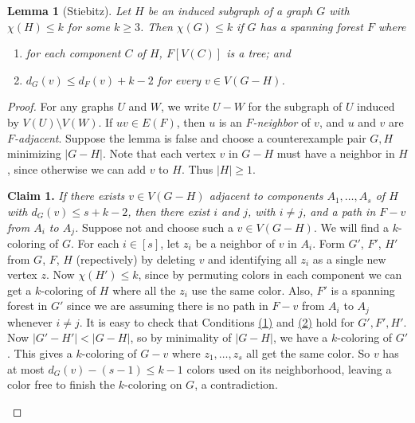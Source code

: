 \documentclass[12pt]{article}
\theoremstyle{plain}
\newtheorem*{Lemma}{Lemma}
\theoremstyle{definition}
\theoremstyle{remark}
\newcommand{\card}[1]{\left|#1\right|}
\newcommand{\irange}[1]{\left[#1\right]}
\newcommand{\brackets}[1]{\left[ #1 \right]}
\begin{document}
\begin{Lemma}[Stiebitz]
\label{stiebitz}
Let $H$ be an induced subgraph of a graph $G$ with $\chi(H) \le k$ for some $k \ge 3$.  Then $\chi(G) \le k$ if $G$ has a spanning forest $F$ where
\begin{enumerate}
\item for each component $C$ of $H$, $F\brackets{V(C)}$ is a tree; and
\label{cond1}
\item $d_G(v) \le d_F(v) + k-2$ for every $v \in V(G-H)$.
\label{cond2}
\end{enumerate}
\end{Lemma}
\begin{proof}
For any graphs $U$ and $W$, we write $U-W$ for the subgraph of $U$ induced by
$V(U)\setminus V(W)$.
If $uv\in E(F)$, then $u$ is an \emph{$F$-neighbor} of $v$, and $u$ and $v$ are
\emph{$F$-adjacent}.
Suppose the lemma is false and choose a counterexample pair $G, H$ minimizing
$|G-H|$.
Note that each vertex $v$ in $G-H$ must have a neighbor in $H$, since 
otherwise we can add $v$ to $H$.  Thus $\card{H}\ge 1$.

\textbf{Claim 1.} \textit{If there exists $v \in V(G-H)$ adjacent to
components $A_1, \ldots, A_s$ of $H$ with $d_G(v) \le s + k - 2$, then there
exist $i$ and $j$, with $i \ne j$, and a path in $F-v$ from $A_i$ to $A_j$.}
Suppose not and choose such a $v \in V(G-H)$.  
We will find a $k$-coloring of $G$.
For each $i \in \irange{s}$, let $z_i$ be a neighbor of $v$ in $A_i$.  Form
$G'$, $F'$, $H'$ from $G$, $F$, $H$ (repectively) by deleting $v$ and
identifying all $z_i$ as a single new vertex $z$.  
Now $\chi(H') \le k$, since by permuting colors in each component we can get
a $k$-coloring of $H$ where all the $z_i$ use the same color.  Also, $F'$ is a
spanning forest in $G'$ since we are assuming there is no path in $F-v$ from
$A_i$ to $A_j$ whenever $i \ne j$.  It is easy to check that Conditions 
\hyperref[cond1]{(1)} and \hyperref[cond2]{(2)} hold for $G', F', H'$.  Now
$|G'-H'|<|G-H|$, so by minimality of $|G-H|$,
we have a $k$-coloring of $G'$.  This gives a $k$-coloring of $G-v$ where $z_1,
\ldots, z_s$ all get the same color.  So $v$ has at most $d_G(v) - (s-1) \le
k-1$ colors used on its neighborhood, leaving a color free to finish the
$k$-coloring on $G$, a contradiction.

\begin{center}
\begin{figure}

\end{figure}
\end{center}
\end{proof}
\end{document}
